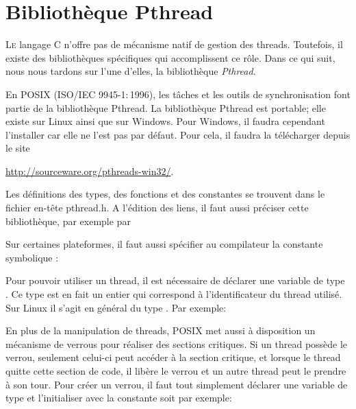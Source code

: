 \newcommand{\function}[1]{\section{#1}}

\chapter{Bibliothèque Pthread}
\startchapter

\lettrine[lines=3]{L}{e} langage C n'offre pas de mécanisme natif de gestion des threads. Toutefois, il existe des bibliothèques spécifiques qui accomplissent ce rôle. Dans ce qui suit, nous nous tardons sur l'une d'elles, la bibliothèque \emph{Pthread}.

En POSIX (ISO/IEC 9945-1$:$1996), les tâches et les outils de synchronisation font partie de la bibliothèque Pthread.
La bibliothèque Pthread est portable; elle existe sur Linux ainsi que sur Windows. Pour Windows, il faudra cependant l'installer car elle ne l'est pas par défaut. Pour cela, il faudra la télécharger depuis le site

\hspace{1cm}\url{http://sourceware.org/pthreads-win32/}.

Les définitions des types, des fonctions et des constantes se trouvent dans le fichier en-tête pthread.h. A l'édition des liens, il faut aussi préciser cette bibliothèque, par exemple par

\hspace{1cm}

Sur certaines plateformes, il faut aussi spécifier au compilateur la constante symbolique :

\hspace{1cm}

Pour pouvoir utiliser un thread, il est nécessaire de déclarer une variable de type . Ce type est en fait un entier qui correspond à l'identificateur du thread utilisé. Sur Linux il s'agit en général du type . Par exemple:

\hspace{1cm}

En plus de la manipulation de threads, POSIX met aussi à disposition un mécanisme de verrous pour réaliser des sections critiques. Si un thread possède le verrou, seulement celui-ci peut accéder à la section critique, et lorsque le thread quitte cette section de code, il libère le verrou et un autre thread peut le prendre à son tour. Pour créer un verrou, il faut tout simplement déclarer une variable de type  et l'initialiser avec la constante  soit par exemple:

